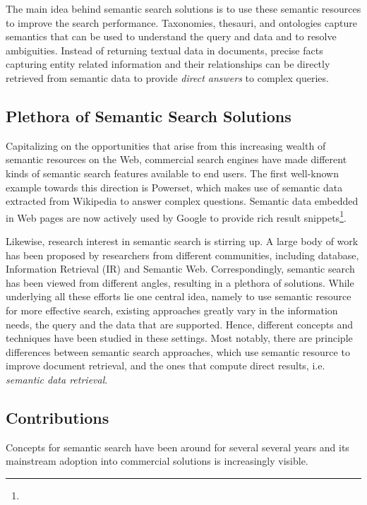 The main idea behind semantic search solutions is to use these semantic resources to improve the search performance. Taxonomies, thesauri, and ontologies capture semantics that can be used to understand the query and data and to resolve ambiguities. Instead of returning textual data in documents, precise facts capturing entity related information and their relationships can be directly retrieved from semantic data to provide \emph{direct answers} to complex queries. 

\subsection{Plethora of Semantic Search Solutions}
Capitalizing on the opportunities that arise from this increasing wealth of semantic resources on the Web, commercial search engines have made different kinds of semantic search features available to end users. The first well-known example towards this direction is Powerset, which makes use of semantic data extracted from Wikipedia to answer complex questions. Semantic data embedded in Web pages are now actively used by Google to provide rich result snippets\footnote{}. 

Likewise, research interest in semantic search is stirring up. A large body of work has been proposed by researchers from different communities, including database, Information Retrieval (IR) and Semantic Web. Correspondingly, semantic search has been viewed from different angles, resulting in a plethora of solutions. While underlying all these efforts lie one central idea, namely to use semantic resource for more effective search, existing approaches greatly vary in the information needs, the query and the data that are supported. Hence, different concepts and techniques have been studied in these settings. Most notably, there are principle differences between semantic search approaches, which use semantic resource to improve document retrieval, and the ones that compute direct results, i.e. \emph{semantic data retrieval}. 

\subsection{Contributions}
Concepts for semantic search have been around for several several years and its mainstream adoption into commercial solutions is increasingly visible. 

